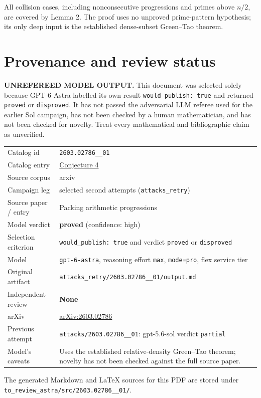 \documentclass[
  11pt,
  a4paper,
]{article}
\newcounter{none} %
\begin{document}
All collision cases, including nonconsecutive progressions and primes
above \(n/2\), are covered by Lemma 2. The proof uses no unproved
prime-pattern hypothesis; its only deep input is the established
dense-subset Green--Tao theorem.

\appendix

\section{Provenance and review
status}\label{provenance-and-review-status}

\begin{warning}

\textbf{UNREFEREED MODEL OUTPUT.} This document was selected solely
because GPT-6 Astra labelled its own result
\texttt{would\_publish:\ true} and returned \texttt{proved} or
\texttt{disproved}. It has not passed the adversarial LLM referee used
for the earlier Sol campaign, has not been checked by a human
mathematician, and has not been checked for novelty. Treat every
mathematical and bibliographic claim as unverified.

\end{warning}

{\def\LTcaptype{none} %
\begin{longtable}[]{@{}
  >{\raggedright\arraybackslash}p{}
  >{\raggedright\arraybackslash}p{}@{}}
\toprule\noalign{}
\endhead
\bottomrule\noalign{}
\endlastfoot
Catalog id & \texttt{2603.02786\_\_01} \\
Catalog entry &
\href{https://graph-theory-ai.github.io/graph-conjectures/arxiv/2603.02786__01/}{Conjecture
4} \\
Source corpus & arxiv \\
Campaign leg & selected second attempts (\texttt{attacks\_retry}) \\
Source paper / entry & Packing arithmetic progressions \\
Model verdict & \textbf{proved} (confidence: high) \\
Selection criterion & \texttt{would\_publish:\ true} and verdict
\texttt{proved} or \texttt{disproved} \\
Model & \texttt{gpt-6-astra}, reasoning effort \texttt{max},
\texttt{mode=pro}, flex service tier \\
Original artifact &
\texttt{attacks\_retry/2603.02786\_\_01/output.md} \\
Independent review & \textbf{None} \\
arXiv & \href{https://arxiv.org/abs/2603.02786}{arXiv:2603.02786} \\
Previous attempt & \texttt{attacks/2603.02786\_\_01}: gpt-5.6-sol
verdict \texttt{partial} \\
Model's caveats & Uses the established relative-density Green--Tao
theorem; novelty has not been checked against the full source paper. \\
\end{longtable}
}

The generated Markdown and LaTeX sources for this PDF are stored under
\texttt{to\_review\_astra/src/2603.02786\_\_01/}.
\end{document}
